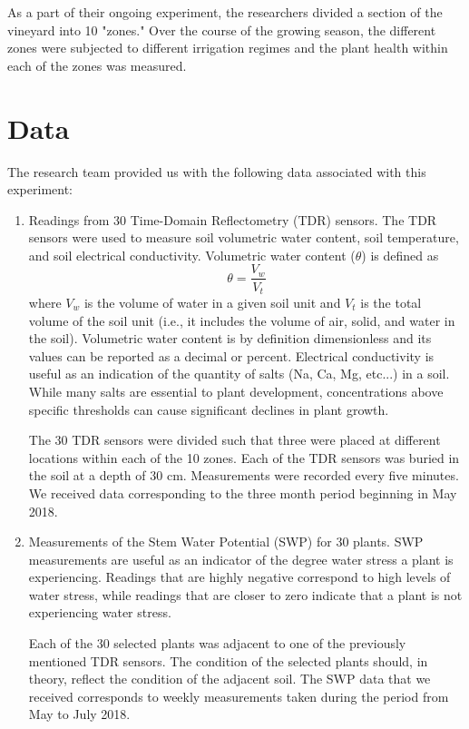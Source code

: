\documentclass[12pt]{scrartcl}
\begin{document}
As a part of their ongoing experiment, the researchers divided a section of the vineyard into 10 "zones." Over the course of the growing season, the different zones were subjected to different irrigation regimes and the plant health within each of the zones was measured.

\section{Data}
The research team provided us with the following data associated with this experiment:

\begin{enumerate}
\item Readings from 30 Time-Domain Reflectometry (TDR) sensors. The TDR sensors were used to measure soil volumetric water content, soil temperature, and soil electrical conductivity. Volumetric water content ($\theta$) is defined as $$\theta = \frac{V_w}{V_t}$$ where $V_w$ is the volume of water in a given soil unit and $V_t$ is the total volume of the soil unit (i.e., it includes the volume of air, solid, and water in the soil). Volumetric water content is by definition dimensionless and its values can be reported as a decimal or percent. Electrical conductivity is useful as an indication of the quantity of salts (Na\pch, Ca\pch[2], Mg\pch[2], etc...) in a soil. While many salts are essential to plant development, concentrations above specific thresholds can cause significant declines in plant growth.

The 30 TDR sensors were divided such that three were placed at different locations within each of the 10 zones. Each of the TDR sensors was buried in the soil at a depth of 30 cm. Measurements were recorded every five minutes. We received data corresponding to the three month period beginning in May 2018.

\item Measurements of the Stem Water Potential (SWP) for 30 plants. SWP measurements are useful as an indicator of the degree water stress a plant is experiencing. Readings that are highly negative correspond to high levels of water stress, while readings that are closer to zero indicate that a plant is not experiencing water stress.

Each of the 30 selected plants was adjacent to one of the previously mentioned TDR sensors. The condition of the selected plants should, in theory, reflect the condition of the adjacent soil. The SWP data that we received corresponds to weekly measurements taken during the period from May to July 2018.


\end{enumerate}
\end{document}

